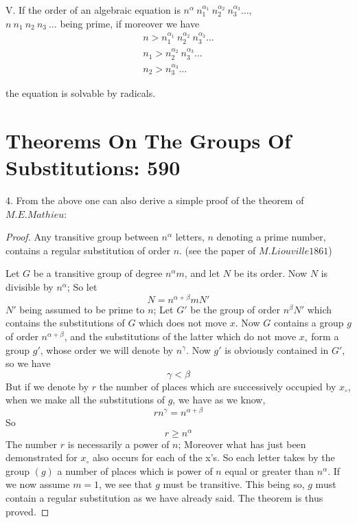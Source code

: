 \documentclass[11pt,fancy]{elegantbook}
\begin{document}
\begin{theorem}
V. If the order of an algebraic equation is $n^\alpha \ {n_1^{\alpha_1} \ {n_2^{\alpha_2} \ {n_3^{\alpha_3}}}} \dots$, \\ $n \ n_1 \ n_2 \ n_3 \ \dots$ being prime, if  moreover we have
\begin{equation}
\begin{aligned}
    n > n_1^{\alpha_1} \ n_2^{\alpha_2} \ n_3^{\alpha_3} \dots \\
    n_1 > n_2^{\alpha_2} \ n_3^{\alpha_3} \dots \\
    n_2 > n_3^{\alpha_3} \dots
\end{aligned}
\end{equation}
\end{theorem}
the equation is solvable by radicals.

\section{Theorems On The Groups Of Substitutions: 590}
4.
From the above one can also derive a simple proof of the theorem of $M.E.Mathieu$:
\begin{proof}
Any transitive group between $n^\alpha$ letters, $n$ denoting a prime number, contains a regular substitution of order $n$. (see the paper of $M.Liouville 1861$)

Let $G$ be a transitive group of degree $n^\alpha{m}$, and let $N$ be its order. Now $N$ is divisible by $n^\alpha$; So let 
\begin{equation}
    N=n^{\alpha+\beta}m{N'}
\end{equation}
$N'$ being assumed to be prime to $n$; 
Let $G'$ be the group of order $n^\beta{N'}$ which contains the substitutions of $G$ which does not move $x$. Now $G$ contains a group $g$ of order $n^{\alpha+\beta}$, and the substitutions of the latter which do not move $x_\circ$ form a group $g'$, whose order we will denote by $n^\gamma$. Now $g'$ is obviously contained in $G'$, so we have 
\begin{equation}
    \gamma<\beta
\end{equation}
But if we denote by $r$ the number of places which are successively occupied by $x_\circ$, when we make all the substitutions of $g$, we have as we know,
\begin{equation}
    r{n^\gamma}=n^{\alpha+\beta}
\end{equation}
So
\begin{equation}
     r\ge n^\alpha
\end{equation}
The number $r$ is necessarily a power of $n$; Moreover what has just been demonstrated for $x_\circ$ also occurs for each of the x\rq s. So each letter takes by the group $(g)$ a number of places which is power of $n$ equal or greater than $n^\alpha$. If we now assume $m=1$, we see that $g$ must be transitive. This being so, $g$ must contain a regular substitution as we have already said. The theorem is thus proved. 
\end{proof}
\end{document}
